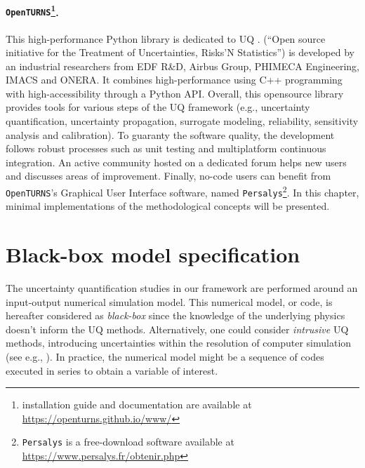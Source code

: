 \paragraph*{\textbf{\texttt{OpenTURNS}}\footnote{\ot installation guide and documentation are available at \url{https://openturns.github.io/www/}}.} 
This high-performance Python library is dedicated to UQ \citep{baudin_dutfoy_2017}. 
\ot (``Open source initiative for the Treatment of Uncertainties, Risks’N Statistics'') is developed by an industrial researchers from  EDF R\&D, Airbus Group, PHIMECA Engineering, IMACS and ONERA.
It combines high-performance using C++ programming with high-accessibility through a Python API. 
Overall, this opensource library provides tools for various steps of the UQ framework 
(e.g., uncertainty quantification, uncertainty propagation, surrogate modeling, reliability, sensitivity analysis and calibration). 
To guaranty the software quality, the development follows robust processes such as unit testing and multiplatform continuous integration. 
An active community hosted on a dedicated forum helps new users and discusses areas of improvement.
Finally, no-code users can benefit from \texttt{OpenTURNS}'s Graphical User Interface software, named \texttt{Persalys}\footnote{\texttt{Persalys} is a free-download software available at \url{https://www.persalys.fr/obtenir.php}}.
In this chapter, minimal \ot implementations of the methodological concepts will be presented. 



\section{Black-box model specification}
The uncertainty quantification studies in our framework are performed around an input-output numerical simulation model. 
This numerical model, or code, is hereafter considered as \textit{black-box} since the knowledge of the underlying physics doesn't inform the UQ methods. 
Alternatively, one could consider \textit{intrusive} UQ methods, introducing uncertainties within the resolution of computer simulation (see e.g., ).
In practice, the numerical model might be a sequence of codes executed in series to obtain a variable of interest.

